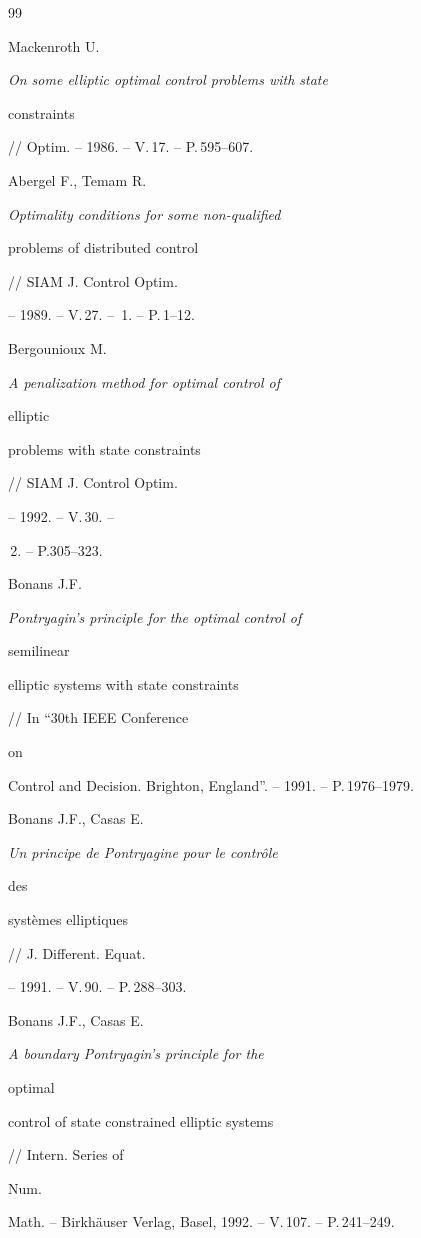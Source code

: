\begin{thebibliography}{99} 


 




Mackenroth U. {\em On some elliptic optimal control problems with state 


constraints} // Optim. -- 1986. -- V.\,17. -- P.\,595--607. 




Abergel F., Temam R. {\em Optimality conditions for some non-qualified 


problems of distributed control} // SIAM J. Control Optim. 


-- 1989. -- V.\,27. -- \No\,1. -- P.\,1--12. 




Bergounioux M. {\em A penalization method for optimal control of 


elliptic 


problems with state constraints} // SIAM J. Control Optim. 


-- 1992. -- V.\,30. -- 


\No\,2. -- P.305--323. 




Bonans J.F. {\em Pontryagin's principle for the optimal control of 


semilinear 


elliptic systems with state constraints} // In ``30th IEEE Conference 


on 


Control and Decision. Brighton, England''. -- 1991. -- P.\,1976--1979. 




Bonans J.F., Casas E. {\em Un principe de Pontryagine pour le contr\^ole 


des 


syst\`emes elliptiques} // J. Different. Equat. 


-- 1991. -- V.\,90. -- P.\,288--303. 




Bonans J.F., Casas E. {\em A boundary Pontryagin's principle for the 


optimal 


control of state constrained elliptic systems} // Intern. Series of 


Num. 


Math. -- Birkh\"auser Verlag, Basel, 1992. -- V.\,107. -- P.\,241--249. 



\end{thebibliography}
